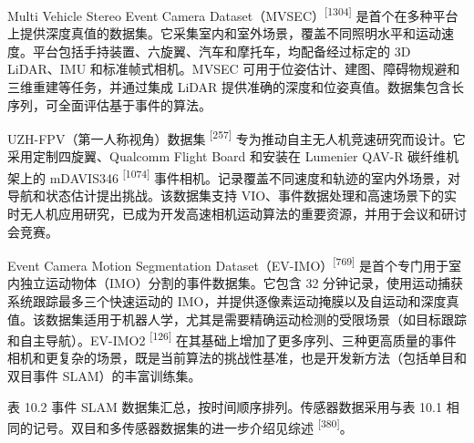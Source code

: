 Multi Vehicle Stereo Event Camera Dataset（MVSEC）\textsuperscript{[1304]} 是首个在多种平台上提供深度真值的数据集。它采集室内和室外场景，覆盖不同照明水平和运动速度。平台包括手持装置、六旋翼、汽车和摩托车，均配备经过标定的 3D LiDAR、IMU 和标准帧式相机。MVSEC 可用于位姿估计、建图、障碍物规避和三维重建等任务，并通过集成 LiDAR 提供准确的深度和位姿真值。数据集包含长序列，可全面评估基于事件的算法。

UZH-FPV（第一人称视角）数据集 \textsuperscript{[257]} 专为推动自主无人机竞速研究而设计。它采用定制四旋翼、Qualcomm Flight Board 和安装在 Lumenier QAV-R 碳纤维机架上的 mDAVIS346 \textsuperscript{[1074]} 事件相机。记录覆盖不同速度和轨迹的室内外场景，对导航和状态估计提出挑战。该数据集支持 VIO、事件数据处理和高速场景下的实时无人机应用研究，已成为开发高速相机运动算法的重要资源，并用于会议和研讨会竞赛。

Event Camera Motion Segmentation Dataset（EV-IMO）\textsuperscript{[769]} 是首个专门用于室内独立运动物体（IMO）分割的事件数据集。它包含 32 分钟记录，使用运动捕获系统跟踪最多三个快速运动的 IMO，并提供逐像素运动掩膜以及自运动和深度真值。该数据集适用于机器人学，尤其是需要精确运动检测的受限场景（如目标跟踪和自主导航）。EV-IMO2 \textsuperscript{[126]} 在其基础上增加了更多序列、三种更高质量的事件相机和更复杂的场景，既是当前算法的挑战性基准，也是开发新方法（包括单目和双目事件 SLAM）的丰富训练集。

表 10.2 事件 SLAM 数据集汇总，按时间顺序排列。传感器数据采用与表 10.1 相同的记号。双目和多传感器数据集的进一步介绍见综述 \textsuperscript{[380]}。

